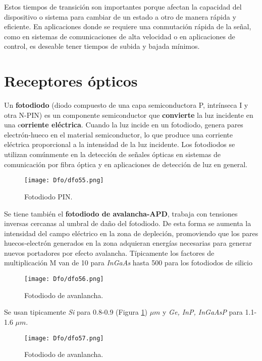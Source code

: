 \documentclass[
	12pt, %
	fleqn, %
	a4paper, %
	oneside, %
]{LegrandOrangeBook}
\begin{document}
\begin{remark}
Estos tiempos de transición son importantes porque afectan la capacidad del dispositivo o sistema para cambiar de un estado a otro de manera rápida y eficiente. En aplicaciones donde se requiere una conmutación rápida de la señal, como en sistemas de comunicaciones de alta velocidad o en aplicaciones de control, es deseable tener tiempos de subida y bajada mínimos.
\end{remark}

\section{Receptores ópticos}
Un \textbf{fotodiodo} (diodo compuesto de una capa semiconductora P, intrínseca I y otra N-PIN) es un componente semiconductor que \textbf{convierte} la luz incidente en una c\textbf{orriente eléctrica}. Cuando la luz incide en un fotodiodo, genera pares electrón-hueco en el material semiconductor, lo que produce una corriente eléctrica proporcional a la intensidad de la luz incidente. Los fotodiodos se utilizan comúnmente en la detección de señales ópticas en sistemas de comunicación por fibra óptica y en aplicaciones de detección de luz en general.
\begin{figure}[H]
\centering
\texttt{[image: Dfo/dfo55.png]}
\caption{Fotodiodo PIN.}
\end{figure}
Se tiene también el \textbf{fotodiodo de avalancha-APD}, trabaja  con  tensiones inversas cercanas al umbral de daño del fotodiodo. De esta forma se aumenta la intensidad del campo eléctrico  en  la  zona  de  depleción,  promoviendo que  los  pares  huecos‐electrón  generados  en  la zona  adquieran  energías  necesarias  para  generar nuevos portadores por efecto avalancha. Típicamente  los  factores  de  multiplicación  M  van 
de 10 para \textit{InGaAs} hasta 500 para los fotodiodos de 
silicio
\begin{figure}[H]
\centering
\texttt{[image: Dfo/dfo56.png]}
\caption{Fotodiodo de avanlancha.}
\end{figure}
\begin{remark}
Se usan tipicamente \textit{Si} para 0.8-0.9 (Figura \ref{fig:res espec fd silicio}) $\mu m$ y \textit{Ge, InP, InGaAsP} para 1.1-1.6 $\mu m$.
\end{remark}
\begin{figure}[H]
\centering
\texttt{[image: Dfo/dfo57.png]}
\caption{Fotodiodo de avanlancha.}
\label{fig:res espec fd silicio}
\end{figure}
\end{document}
